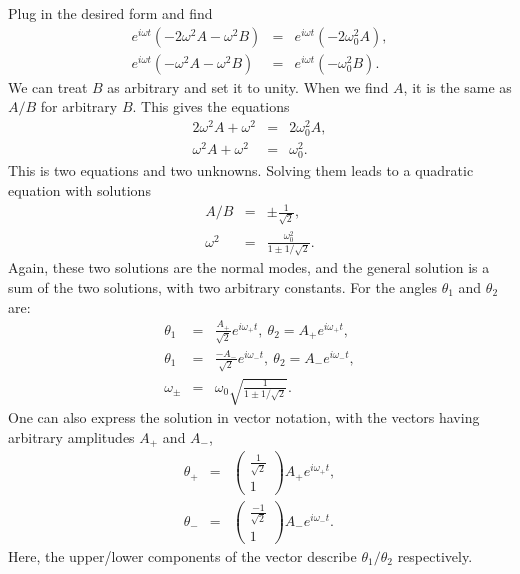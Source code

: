 Plug in the desired form and find
\begin{eqnarray*}
e^{i\omega t}(-2\omega^2A-\omega^2B)&=&e^{i\omega
  t}(-2\omega_0^2A),\\ e^{i\omega
  t}(-\omega^2A-\omega^2B)&=&e^{i\omega t}(-\omega_0^2B).
\end{eqnarray*}
We can treat $B$ as arbitrary and set it to unity. When we find $A$,
it is the same as $A/B$ for arbitrary $B$. This gives the equations
\begin{eqnarray*}
2\omega^2A+\omega^2&=&2\omega_0^2A,\\ \omega^2A+\omega^2&=&\omega_0^2.
\end{eqnarray*}
This is two equations and two unknowns. Solving them leads to a
quadratic equation with solutions
\begin{eqnarray*}
A/B&=&\pm\frac{1}{\sqrt{2}},\\ \omega^2&=&\frac{\omega_0^2}{1\pm
  1/\sqrt{2}}.
\end{eqnarray*}
Again, these two solutions are the normal modes, and the general
solution is a sum of the two solutions, with two arbitrary
constants. For the angles $\theta_1$ and $\theta_2$ are:
\begin{eqnarray*}
\theta_1&=&\frac{A_+}{\sqrt{2}}e^{i\omega_+t},
~\theta_2=A_+e^{i\omega_+t},\\ \theta_1&=&\frac{-A_-}{\sqrt{2}}e^{i\omega_-t},
~\theta_2=A_-e^{i\omega_-t},\\ \omega_{\pm}&=&\omega_0\sqrt{\frac{1}{1\pm
    1/\sqrt{2}}}.
\end{eqnarray*}
One can also express the solution in vector notation, with the vectors
having arbitrary amplitudes $A_+$ and $A_-$,
\begin{eqnarray*}
\theta_+&=&\left(\begin{array}{c}
  \frac{1}{\sqrt{2}}\\ 1\end{array}\right)A_+e^{i\omega_+t},\\ \theta_-&=&\left(\begin{array}{c}
    \frac{-1}{\sqrt{2}}\\ 1\end{array}\right)A_-e^{i\omega_-t}.
\end{eqnarray*}
Here, the upper/lower components of the vector describe
$\theta_1/\theta_2$ respectively.

\exampleend

